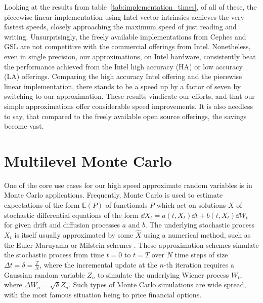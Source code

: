 \documentclass[manuscript,review]{acmart}
\begin{document}
Looking at the results from table~\ref{tab:implementation_times}, of all of these, the piecewise linear implementation using Intel vector intrinsics achieves the very fastest speeds, closely approaching the maximum speed of just reading and writing. Unsurprisingly, the freely available implementations from Cephes and GSL are not competitive with the commercial offerings from Intel. Nonetheless, even in single precision, our approximations, on Intel hardware, consistently beat the performance achieved from the Intel high accuracy (HA) or low accuracy (LA) offerings. Comparing the high accuracy Intel offering and the piecewise linear implementation, there stands to be a speed up by a factor of seven by switching to our approximation. These results vindicate our efforts, and that our simple approximations offer considerable speed improvements. It is also needless to say, that compared to the freely available open source offerings, the savings become vast. 

\section{Multilevel Monte Carlo}
\label{sec:multilevel_monte_carlo}

One of the core use cases for our high speed approximate random variables is in Monte Carlo applications. Frequently, Monte Carlo is used to estimate expectations of the form $ \mathbb{E}(P) $ of functionals $ P $ which act on solutions $ X $ of stochastic differential equations of the form $ \dd{X_t} = a(t, X_t) \dd{t} + b(t, X_t)\dd{W_t} $ for given drift and diffusion processes $ a $ and $ b $. The underlying stochastic process $ X_t $ is itself usually approximated by some $ \hat{X} $ using a numerical method, such as the Euler-Maruyama or Milstein schemes \citep{asmussen2007stochastic,kloeden1999numerical,lord2014introduction}. These approximation schemes simulate the stochastic process from time $ t = 0 $ to $ t = T $ over $ N $ time steps of size $ \Delta t = \delta = \tfrac{T}{N} $, where the incremental update at the $ n $-th iteration requires a Gaussian random variable $ Z_n $ to simulate the underlying Wiener process $ W_t $, where $ \Delta W_n = \sqrt{\delta}Z_n $. Such types of Monte Carlo simulations are wide spread, with the most famous situation being to price financial options. 
\end{document}

